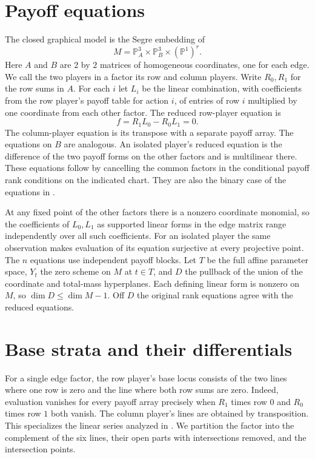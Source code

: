 \documentclass[11pt,a4paper]{amsart}
\newcommand{\PP}{\mathbb P}
\begin{document}
\section{Payoff equations}

The closed graphical model is the Segre embedding of
\[
M=\PP^3_A\times\PP^3_B\times(\PP^1)^r.
\]
Here $A$ and $B$ are $2$ by $2$ matrices of homogeneous coordinates, one for
each edge. We call the two players in a factor its row and column players.
Write $R_0,R_1$ for the row sums in $A$. For each $i$ let $L_i$ be the
linear combination, with coefficients from the row player's payoff table for
action $i$, of entries of row $i$ multiplied by one coordinate from each
other factor. The reduced row-player equation is
\[
f=R_1 L_0-R_0 L_1=0.
\]
The column-player equation is its transpose with a separate payoff array.
The equations on $B$ are analogous. An isolated player's reduced equation is
the difference of the two payoff forms on the other factors and is
multilinear there. These equations follow by cancelling the common
factors in the conditional payoff rank conditions on the indicated chart.
They are also the binary case of the equations in \cite[Proposition~4.3]{totally}.

At any fixed point of the other factors there is a nonzero coordinate
monomial, so the coefficients of $L_0,L_1$ as supported linear forms in
the edge matrix range independently over all such coefficients. For an
isolated player the same observation makes evaluation of its equation
surjective at every projective point. The $n$ equations use independent
payoff blocks. Let $T$ be the full affine parameter space, $Y_t$ the
zero scheme on $M$ at $t\in T$, and $D$ the pullback of the union of the
coordinate and total-mass hyperplanes. Each defining linear form is
nonzero on $M$, so $\dim D\leq \dim M-1$. Off $D$ the original rank
equations agree with the reduced equations.

\section{Base strata and their differentials}

For a single edge factor, the row player's base locus consists of the
two lines where one row is zero and the line where both row sums are
zero. Indeed, evaluation vanishes for every payoff array precisely
when $R_1$ times row $0$ and $R_0$ times row $1$ both vanish.
The column player's lines are obtained by transposition.
This specializes the linear series analyzed in \cite[Lemmas~7--8]{game}.
We partition the factor into the complement of the six lines, their
open parts with intersections removed, and the intersection points.
\end{document}
